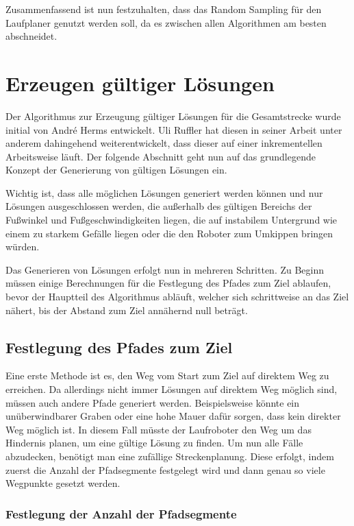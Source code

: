 Zusammenfassend ist nun festzuhalten, dass das Random Sampling für den Laufplaner genutzt werden soll, da es zwischen allen Algorithmen am besten abschneidet.

\section{Erzeugen gültiger Lösungen}

Der Algorithmus zur Erzeugung gültiger Lösungen für die Gesamtstrecke wurde initial von André Herms \autocite{herms2004} entwickelt. Uli Ruffler \autocite{ruffler2006} hat diesen in seiner Arbeit unter anderem dahingehend weiterentwickelt, dass dieser auf einer inkrementellen Arbeitsweise läuft. Der folgende Abschnitt geht nun auf das grundlegende Konzept der Generierung von gültigen Lösungen ein.

Wichtig ist, dass alle möglichen Lösungen generiert werden können und nur Lösungen ausgeschlossen werden, die außerhalb des gültigen Bereichs der Fußwinkel und Fußgeschwindigkeiten liegen, die auf instabilem Untergrund wie einem zu starkem Gefälle liegen oder die den Roboter zum Umkippen bringen würden.

Das Generieren von Lösungen erfolgt nun in mehreren Schritten. Zu Beginn müssen einige Berechnungen für die Festlegung des Pfades zum Ziel ablaufen, bevor der Hauptteil des Algorithmus abläuft, welcher sich schrittweise an das Ziel nähert, bis der Abstand zum Ziel annähernd null beträgt.

\subsection{Festlegung des Pfades zum Ziel}

Eine erste Methode ist es, den Weg vom Start zum Ziel auf direktem Weg zu erreichen. Da allerdings nicht immer Lösungen auf direktem Weg möglich sind, müssen auch andere Pfade generiert werden. Beispielsweise könnte ein unüberwindbarer Graben oder eine hohe Mauer dafür sorgen, dass kein direkter Weg möglich ist. In diesem Fall müsste der Laufroboter den Weg um das Hindernis planen, um eine gültige Lösung zu finden. Um nun alle Fälle abzudecken, benötigt man eine zufällige Streckenplanung. Diese erfolgt, indem zuerst die Anzahl der Pfadsegmente festgelegt wird und dann genau so viele Wegpunkte gesetzt werden.

\subsubsection{Festlegung der Anzahl der Pfadsegmente}


